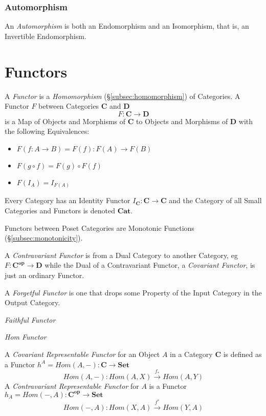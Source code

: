 \documentclass{article}
\begin{document}
\subsubsection{Automorphism}\label{subsec:automorphism}

An \emph{Automorphism} is both an Endomorphism and an Isomorphism,
that is, an Invertible Endomorphism.

\section{Functors}\label{sec:category_functors}

A \emph{Functor} is a \emph{Homomorphism}
(\S\ref{subsec:homomorphism}) of Categories. A Functor $F$ between
Categories $\mathbf{C}$ and $\mathbf{D}$
\[
    F : \mathbf{C} \rightarrow \mathbf{D}
\]
is a Map of Objects and Morphisms of $\mathbf{C}$ to Objects and
Morphisms of $\mathbf{D}$ with the following Equivalences:
\begin{itemize}
\item $F(f : A \rightarrow B) = F(f) : F(A) \rightarrow F(B)$
\item $F(g \circ f) = F(g) \circ F(f)$
\item $F(I_A) = I_{F(A)}$
\end{itemize}
Every Category has an Identity Functor $I_{\mathbf{C}} : \mathbf{C}
\rightarrow \mathbf{C}$ and the Category of all Small Categories and
Functors is denoted $\mathbf{Cat}$.

Functors between Poset Categories are Monotonic Functions
(\S\ref{subsec:monotonicity}).

A \emph{Contravariant Functor} is from a Dual Category to another
Category, eg $F : \mathbf{C^{op}} \rightarrow \mathbf{D}$ while the
Dual of a Contravariant Functor, a \emph{Covariant Functor}, is just
an ordinary Functor.

A \emph{Forgetful Functor} is one that drops some Property of the
Input Category in the Output Category.

\emph{Faithful Functor}

\emph{Hom Functor}

A \emph{Covariant Representable Functor} for an Object $A$ in a
Category $\mathbf{C}$ is defined as a Functor $h^A = Hom(A,-) : \mathbf{C}
\rightarrow \mathbf{Set}$
\[
    Hom(A,-) : Hom(A,X) \xrightarrow{f_*} Hom(A,Y)
\]
A \emph{Contravariant Representable Functor} for $A$ is a Functor $h_A
= Hom(-,A) : \mathbf{C^{op}} \rightarrow \mathbf{Set}$
\[
    Hom(-,A) : Hom(X,A) \xrightarrow{f^*} Hom(Y,A)
\]
\end{document}
